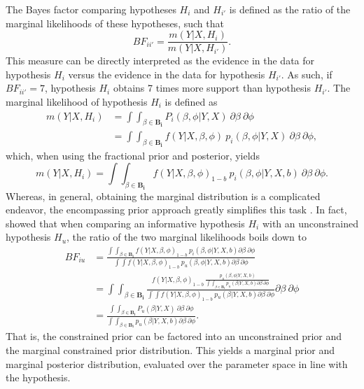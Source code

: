 \documentclass[review, 3p, authoryear]{elsarticle} %
\begin{document}
The Bayes factor comparing hypotheses \(H_i\) and \(H_{i'}\) is defined as the ratio of the marginal likelihoods of these hypotheses, such that
\[
BF_{ii'} = \frac{m(Y | X, H_i)}{m(Y | X, H_{i'})}.
\]
This measure can be directly interpreted as the evidence in the data for hypothesis \(H_i\) versus the evidence in the data for hypothesis \(H_{i'}\).
As such, if \(BF_{ii'} = 7\), hypothesis \(H_i\) obtains 7 times more support than hypothesis \(H_{i'}\).
The marginal likelihood of hypothesis \(H_i\) is defined as
\[
\begin{aligned}
m(Y | X, H_i) 
&= \int \int_{\beta \in \boldsymbol{B_i}}  P_i(\beta, \phi | Y, X) ~ \partial \beta ~ \partial \phi \\
&= \int \int_{\beta \in \boldsymbol{B_i}} f(Y | X, \beta, \phi) ~ p_i(\beta, \phi | Y, X) ~ \partial \beta ~ \partial \phi,
\end{aligned}
\]
which, when using the fractional prior and posterior, yields
\[
m(Y | X, H_i) = 
  \int \int_{\beta \in \boldsymbol{B_i}}  f(Y | X, \beta, \phi)_{1-b} ~ p_i(\beta, \phi | Y, X, b) ~ \partial \beta ~ \partial \phi.
\]
Whereas, in general, obtaining the marginal distribution is a complicated endeavor, the encompassing prior approach greatly simplifies this task \citep{klugkist_inequality_2005}.
In fact, \citet{gu_approximated_2018} showed that when comparing an informative hypothesis \(H_i\) with an unconstrained hypothesis \(H_u\), the ratio of the two marginal likelihoods boils down to
\[
\begin{aligned}
BF_{iu} &= 
\frac{
  \int \int_{\beta \in \boldsymbol{B_i}} f (Y | X, \beta, \phi)_{1-b} ~ p_i(\beta, \phi | Y, X, b) \partial \beta ~ \partial \phi
}{
  \int \int f(Y | X, \beta, \phi)_{1-b} ~ p_u(\beta, \phi | Y, X, b) \partial \beta ~ \partial \phi
} \\
&= \int \int_{\beta \in \boldsymbol{B_i}} 
\frac{
  f (Y | X, \beta, \phi)_{1-b} ~  \frac{p_u (\beta, \phi | Y, X, b)}{\int \int_{\beta \in \boldsymbol{B_i}} p_u (\beta | Y, X, b) \partial \beta ~ \partial \phi}
}{
  \int \int f(Y|X, \beta, \phi)_{1-b} ~ p_u(\beta | Y, X, b) \partial \beta ~ \partial \phi
} \partial \beta ~ \partial \phi \\
&= \frac{
   \int \int_{\beta \in \boldsymbol{B_i}} P_u(\beta|Y, X) ~ \partial \beta ~ \partial \phi
}{
  \int\int_{\beta \in \boldsymbol{B_i}} p_u(\beta | Y, X, b) \partial \beta ~ \partial \phi
}.
\end{aligned}
\]
That is, the constrained prior can be factored into an unconstrained prior and the marginal constrained prior distribution.
This yields a marginal prior and marginal posterior distribution, evaluated over the parameter space in line with the hypothesis.
\end{document}
